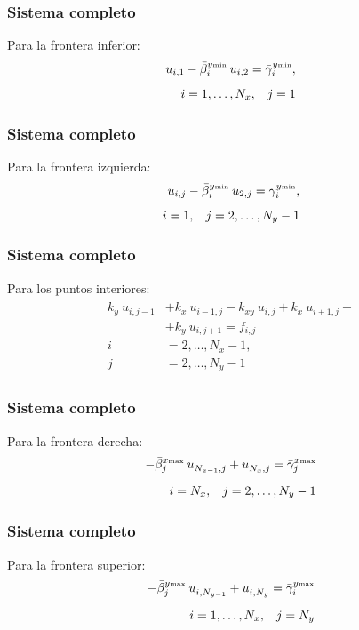 \documentclass[12pt]{beamer}
\begin{document}
\begin{frame}
\frametitle{Sistema completo}
Para la frontera inferior:
\pause
\begin{align}
u_{i, 1} - \bar{\beta}_{i}^{y {\text{\tiny{min}}}} \: u_{i, 2} = \bar{\gamma}_{i}^{y {\text{\tiny{min}}}}, \\[0.5em]
i = 1, \ldots, N_{x}, \hspace{0.3cm} j = 1 \nonumber
\label{eq:ecuacion_13_09}
\end{align}
\end{frame}
\begin{frame}
\frametitle{Sistema completo}
Para la frontera izquierda:
\pause
\begin{align}
u_{i, j} - \bar{\beta}_{i}^{y {\text{\tiny{min}}}} \: u_{2, j} = \bar{\gamma}_{i}^{y {\text{\tiny{min}}}}, \\[0.5em]
i = 1, \hspace{0.3cm} j = 2, \ldots, N_{y} - 1 \nonumber
\label{eq:ecuacion_13_10}
\end{align}
\end{frame}
\begin{frame}
\frametitle{Sistema completo}
Para los puntos interiores:
\pause
\begin{align}
\begin{aligned}
k_{y} \: u_{i, j-1} &+ k_{x} \: u_{i-1, j} - k_{xy} \: u_{i, j} + k_{x} \: u_{i+1, j} + \\
&+ k_{y} \: u_{i, j+1} =  f_{i,j} \\[0.5em]
i &= 2, \ldots, N_{x} - 1, \nonumber \\[0.5em]
j &= 2, \ldots, N_{y} - 1 \nonumber
\end{aligned}
\label{eq:ecuacion_13_11}
\end{align}
\end{frame}
\begin{frame}
\frametitle{Sistema completo}
Para la frontera derecha:
\pause
\begin{align}
- \bar{\beta}_{j}^{x {\text{\tiny{max}}}} \:  u^{}_{N_{x-1}, j} + u^{}_{N_{x},j}  =  \bar{\gamma}_{j}^{x {\text{\tiny{max}}}} \\[0.5em]
i = N_{x}, \hspace{0.3cm} j = 2, \ldots, N_{y} - 1 \nonumber
\label{eq:ecuacion_13_12}
\end{align}
\end{frame}
\begin{frame}
\frametitle{Sistema completo}
Para la frontera superior:
\pause
\begin{align}
- \bar{\beta}_{j}^{y {\text{\tiny{max}}}} \:  u^{}_{i, N_{y-1}} + u^{}_{i, N_{y}}  =  \bar{\gamma}_{i}^{y {\text{\tiny{max}}}} \\[0.5em]
i = 1, \ldots, N_{x}, \hspace{0.3cm} j = N_{y} \nonumber
\label{eq:ecuacion_13_13}
\end{align}
\end{frame}
\end{document}
